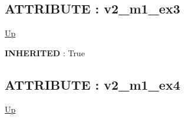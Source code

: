 \subsection*{ATTRIBUTE : v2\_m1\_ex3}
\hypertarget{ecldoc:inintest.example_3.mod_1.v2_m1_ex3}{}
\par
\begin{minipage}[t]{\textwidth}
\begin{flushleft}
  
\end{flushleft}
\end{minipage}
\hyperlink{ecldoc:example_4.mod_1}{Up} \\
\par
\par
\textbf{INHERITED} : True \\
\subsection*{ATTRIBUTE : v2\_m1\_ex4}
\hypertarget{ecldoc:example_4.mod_1.v2_m1_ex4}{}
\par
\begin{minipage}[t]{\textwidth}
\begin{flushleft}
  
\end{flushleft}
\end{minipage}
\hyperlink{ecldoc:example_4.mod_1}{Up} \\
\par
\par


